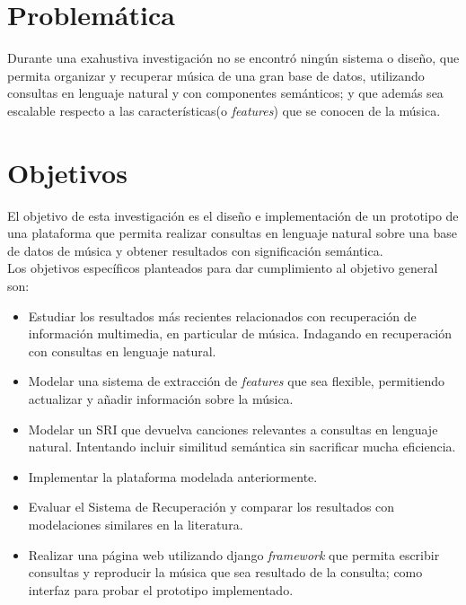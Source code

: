 \section{Problemática}
Durante una exahustiva investigación no se encontró ningún sistema o diseño, que permita organizar y recuperar música de una gran base de datos, utilizando consultas en lenguaje natural y con componentes semánticos; y que además sea escalable respecto a las características(o \textit{features}) que se conocen de la música. \\
\section{Objetivos}
El objetivo de esta investigación es el diseño e implementación de un prototipo de una plataforma que permita realizar consultas en lenguaje natural sobre una base de datos de música y obtener resultados con significación semántica.\\
Los objetivos específicos planteados para dar cumplimiento al objetivo general son:
\begin{itemize}
    \item Estudiar los resultados más recientes relacionados con recuperación de información multimedia, en particular de música. Indagando en recuperación con consultas en lenguaje natural.
    \item Modelar una sistema de extracción de \textit{features} que sea flexible, permitiendo actualizar y añadir información sobre la música.
    \item Modelar un SRI que devuelva canciones relevantes a consultas en lenguaje natural. Intentando incluir similitud semántica sin sacrificar mucha eficiencia.
    \item Implementar la plataforma modelada anteriormente.
    \item Evaluar el Sistema de Recuperación y comparar los resultados con modelaciones similares en la literatura.
    \item Realizar una página web utilizando django \textit{framework} que permita escribir consultas y reproducir la música que sea resultado de la consulta; como interfaz para probar el prototipo implementado.
\end{itemize}
